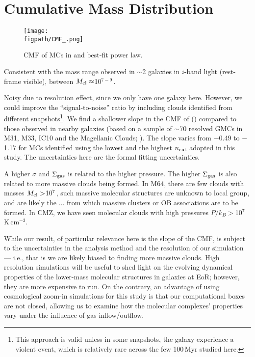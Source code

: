 \documentclass[apj]{emulateapj} %
\begin{document}
\section{Cumulative Mass Distribution}   \label{sec:cmf}

\begin{figure*}[htbp]
\centering
\texttt{[image: \\figpath/CMF\_.png]}  
\caption{
CMF of MCs in \flower and best-fit power law.
\label{fig:cmf}}
\end{figure*}

Consistent with the mass range observed in \z$\sim$2 galaxies in $i$-band light (rest-frame visible), 
between $M_{\rm cl}\approx$10$^{7-9}$\,\Msun \citep{Elmegreen07a, Elmegreen09a}.

Noisy due to resolution effect, since we only have one galaxy here. However, 
we could improve the ``signal-to-noise'' ratio by including clouds identified from different 
snapshots\footnote{This approach is valid unless in some snapshots, 
the galaxy experience a violent event, which is relatively rare across the few 100\,Myr studied here.}.
We find a shallower slope in the CMF of \flower () 
compared to those observed in nearby galaxies (based on a sample of 
$\sim$70 resolved GMCs in M31, M33, IC10 and the Magellanic Clouds; \citealt{Blitz07a}).
The slope varies from $-$0.49 to $-$1.17 for MCs identified using the lowest and the 
highest $n_{\rm cut}$ adopted in this study.
The uncertainties here are the formal fitting uncertainties.

A higher $\sigma$ and $\Sigma_{\rm gas}$ is related to the higher 
pressure. The higher $\Sigma_{\rm gas}$ is also related to more massive clouds being formed.
In M64, there are few clouds with masses $M_{\rm cl}>$10$^7$\,\Msun, such massive molecular 
structures are unknown to local group, and are likely the ... from which massive clusters or OB associations are to be formed.
In CMZ, we have seen molecular clouds with high pressures $P/k_B > $10$^7$\,K\,cm$^{-3}$.

While our result, of particular relevance here is the slope of the CMF, is subject 
to the uncertainties in the analysis method and the resolution of our simulation --- i.e., that is 
we are likely biased to finding more massive clouds.
High resolution simulations will be useful to shed light on 
the evolving dynamical properties of the lower-mass molecular structures in 
galaxies at EoR; however, they are more expensive to run.
On the contrary, an advantage of using cosmological zoom-in simulations for this study
is that our computational boxes are not closed, allowing us to examine how 
the molecular complexes' properties vary under the influence of gas inflow/outflow.
\end{document}
